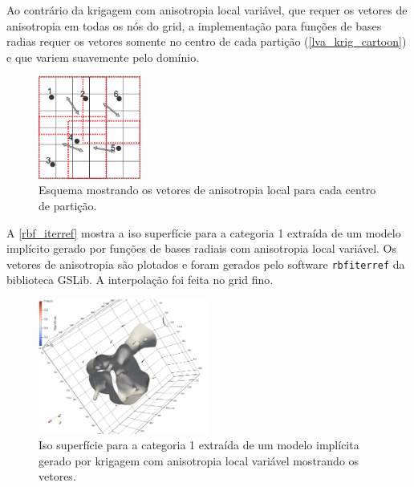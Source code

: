 Ao contrário da krigagem com anisotropia local variável, que requer os vetores de anisotropia em todas os nós do grid, a implementação para funções de bases radias requer os vetores somente no centro de cada partição (\autoref{lva_krig_cartoon}) e que variem suavemente pelo domínio.

\begin{figure}[!ht]
\caption{\label{lva_rbf+cartoon} Esquema mostrando os vetores de anisotropia local para cada centro de partição.}
	\begin{center}
		\includegraphics[width=0.3\textwidth]{capitulo_2/lvarbf.jpg}
	\end{center}
\end{figure}

A \autoref{rbf_iterref} mostra a iso superfície para a categoria 1 extraída de um modelo implícito gerado por funções de bases radiais com anisotropia local variável. Os vetores de anisotropia são plotados e foram gerados pelo software \verb|rbfiterref| da biblioteca GSLib. A interpolação foi feita no grid fino.

\begin{figure}[!ht]
\caption{\label{rbf_iterref}Iso superfície para a categoria 1 extraída de um modelo implícita gerado por krigagem com anisotropia local variável mostrando os vetores.}
	\begin{center}
		\includegraphics[width=0.5\textwidth]{capitulo_2/rbf_iterref.jpeg}
	\end{center}
\end{figure}

